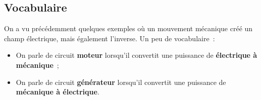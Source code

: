 \documentclass[../../main/main.tex]{subfiles}
\begin{document}
\subsection{Vocabulaire}
\label{ssec:voca}

On a vu précédemment quelques exemples où un mouvement mécanique créé un champ
électrique, mais également l'inverse. Un peu de vocabulaire~:
\begin{itemize}
	\item On parle de circuit \textbf{moteur} lorsqu'il convertit une puissance
	      de \textbf{électrique à mécanique}~;
	\item On parle de circuit \textbf{générateur} lorsqu'il convertit une puissance
	      de \textbf{mécanique à électrique}.
\end{itemize}
\begin{figure}[h]
	\centering
	\noindent
	\begin{minipage}[c]{.48\linewidth}
	\end{minipage}
	\hfill
	\begin{minipage}[c]{.48\linewidth}
\end{minipage}
\end{figure}
\end{document}
